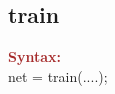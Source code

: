 \subsection{train}

\noindent \textbf{\textcolor{brown}{Syntax:}}\\

\noindent net = train(....);\\





